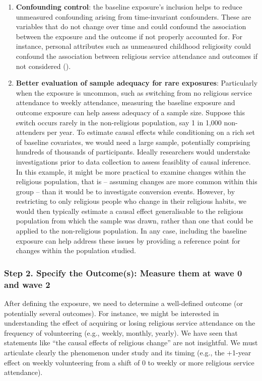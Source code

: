 \documentclass[
  singlecolumn]{article}
\begin{document}
\begin{enumerate}
\def\labelenumi{\arabic{enumi}.}
\setcounter{enumi}{1}
\item
  \textbf{Confounding control}: the baseline exposure's inclusion helps
  to reduce unmeasured confounding arising from time-invariant
  confounders. These are variables that do not change over time and
  could confound the association between the exposure and the outcome if
  not properly accounted for. For instance, personal attributes such as
  unmeasured childhood religiosity could confound the association
  between religious service attendance and outcomes if not considered
  ().
\item
  \textbf{Better evaluation of sample adequacy for rare exposures}:
  Particularly when the exposure is uncommon, such as switching from no
  religious service attendance to weekly attendance, measuring the
  baseline exposure and outcome exposure can help assess adequacy of a
  sample size. Suppose this switch occurs rarely in the non-religious
  population, say 1 in 1,000 non-attenders per year. To estimate causal
  effects while conditioning on a rich set of baseline covariates, we
  would need a large sample, potentially comprising hundreds of
  thousands of participants. Ideally researchers would understake
  investigations prior to data collection to assess feasiblity of causal
  inference. In this example, it might be more practical to examine
  changes within the religious population, that is -- assuming changes
  are more common within this group -- than it would be to investigate
  conversion events. However, by restricting to only religious people
  who change in their religious habits, we would then typically estimate
  a causal effect generalisable to the religious population from which
  the sample was drawn, rather than one that could be applied to the
  non-religious population. In any case, including the baseline exposure
  can help address these issues by providing a reference point for
  changes within the population studied.
\end{enumerate}

\subsubsection{Step 2. Specify the Outcome(s): Measure them at wave 0
and wave
2}\label{step-2.-specify-the-outcomes-measure-them-at-wave-0-and-wave-2}

After defining the exposure, we need to determine a well-defined outcome
(or potentially several outcomes). For instance, we might be interested
in understanding the effect of acquiring or losing religious service
attendance on the frequency of volunteering (e.g., weekly, monthly,
yearly). We have seen that statements like ``the causal effects of
religious change'' are not insightful. We must articulate clearly the
phenomenon under study and its timing (e.g., the +1-year effect on
weekly volunteering from a shift of 0 to weekly or more religious
service attendance).
\end{document}
